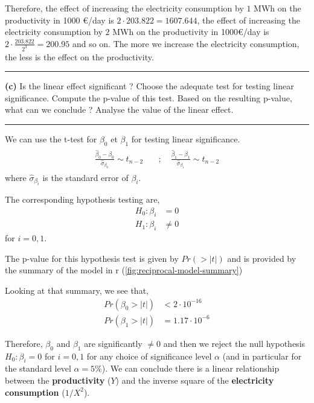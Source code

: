 Therefore, the effect of increasing the electricity consumption by $1$ MWh on the productivity in 1000 \euro/day is $2 \cdot 203.822 = 1607.644$, the effect of increasing the electricity consumption by $2$ MWh on the productivity in 1000\euro/day is $2 \cdot \frac{203.822}{2^3} = 200.95$ and so on. The more we increase the electricity consumption, the less is the effect on the productivity.

\begin{center}\rule{6cm}{0.4pt}\end{center}

\textbf{(c)} Is the linear effect significant ? Choose the adequate test for testing linear significance. Compute the p-value of this test. Based on the resulting p-value, what can we conclude ? Analyse the value of the linear effect.

\begin{center}\rule{6cm}{0.4pt}\end{center}

We can use the t-test for $\beta_0$ et $\beta_1$ for testing linear significance.
\begin{align*}
  \begin{array}{rl}
    \frac{\hat{\beta}_0 - \beta_0}{\hat{\sigma}_{\beta_0}} \sim t_{n-2} \quad &; \quad 
    \frac{\hat{\beta}_1 - \beta_1}{\hat{\sigma}_{\beta_1}} \sim t_{n-2}
  \end{array}
\end{align*}
where $\hat{\sigma}_{\beta_i}$ is the standard error of $\beta_i$.

The corresponding hypothesis testing are, 
\begin{align*}
  H_0: \beta_i &= 0 \\
  H_1: \beta_i &\neq 0
\end{align*}
for $i = 0,1$. 

The p-value for this hypothesis test is given by $Pr(> |t|)$ and is provided by the summary of the model in r (\autoref{fig:reciprocal-model-summary}) 

Looking at that summary, we see that, 
\begin{align*}
  Pr(\beta_0 > |t|) &< 2 \cdot 10^{-16} \\
  Pr(\beta_1 > |t|) &= 1.17 \cdot 10^{-6}
\end{align*}

Therefore, $\beta_0$ and $\beta_1$ are significantly $\neq 0$ and then we reject the null hypothesis $H_0: \beta_i = 0$ for $i = 0,1$ for any choice of significance level $\alpha$ (and in particular for the standard level $\alpha = 5\%$). We can conclude there is a linear relationship between the \textbf{productivity} ($Y$) and the inverse square of the \textbf{electricity consumption} ($1/X^2$).